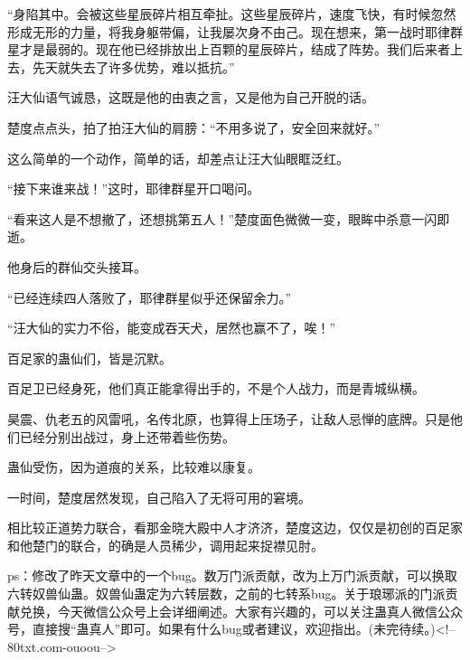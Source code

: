 \begin{this_body}
“身陷其中。会被这些星辰碎片相互牵扯。这些星辰碎片，速度飞快，有时候忽然形成无形的力量，将我身躯带偏，让我屡次身不由己。现在想来，第一战时耶律群星才是最弱的。现在他已经排放出上百颗的星辰碎片，结成了阵势。我们后来者上去，先天就失去了许多优势，难以抵抗。”

汪大仙语气诚恳，这既是他的由衷之言，又是他为自己开脱的话。

楚度点点头，拍了拍汪大仙的肩膀：“不用多说了，安全回来就好。”

这么简单的一个动作，简单的话，却差点让汪大仙眼眶泛红。

“接下来谁来战！”这时，耶律群星开口喝问。

“看来这人是不想撤了，还想挑第五人！”楚度面色微微一变，眼眸中杀意一闪即逝。

他身后的群仙交头接耳。

“已经连续四人落败了，耶律群星似乎还保留余力。”

“汪大仙的实力不俗，能变成吞天犬，居然也赢不了，唉！”

百足家的蛊仙们，皆是沉默。

百足卫已经身死，他们真正能拿得出手的，不是个人战力，而是青城纵横。

昊震、仇老五的风雷吼，名传北原，也算得上压场子，让敌人忌惮的底牌。只是他们已经分别出战过，身上还带着些伤势。

蛊仙受伤，因为道痕的关系，比较难以康复。

一时间，楚度居然发现，自己陷入了无将可用的窘境。

相比较正道势力联合，看那金晓大殿中人才济济，楚度这边，仅仅是初创的百足家和他楚门的联合，的确是人员稀少，调用起来捉襟见肘。

ps：修改了昨天文章中的一个bug。数万门派贡献，改为上万门派贡献，可以换取六转奴兽仙蛊。奴兽仙蛊定为六转层数，之前的七转系bug。关于琅琊派的门派贡献兑换，今天微信公众号上会详细阐述。大家有兴趣的，可以关注蛊真人微信公众号，直接搜“蛊真人”即可。如果有什么bug或者建议，欢迎指出。(未完待续。)<!--80txt.com-ouoou-->

\end{this_body}

